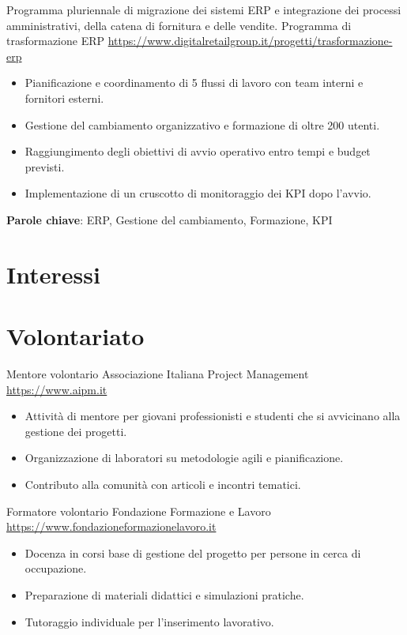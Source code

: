\documentclass[a4paper, serif, 10pt]{moderncv}
\begin{document}
        {Programma pluriennale di migrazione dei sistemi ERP e integrazione dei processi amministrativi, della catena di fornitura e delle vendite.}
        {Programma di trasformazione ERP}
        {\url{https://www.digitalretailgroup.it/progetti/trasformazione-erp}}
        {}
        {\begin{itemize}
\item Pianificazione e coordinamento di 5 flussi di lavoro con team interni e fornitori esterni.
\item Gestione del cambiamento organizzativo e formazione di oltre 200 utenti.
\item Raggiungimento degli obiettivi di avvio operativo entro tempi e budget previsti.
\item Implementazione di un cruscotto di monitoraggio dei KPI dopo l'avvio.
\end{itemize}
\textbf{Parole chiave}: ERP, Gestione del cambiamento, Formazione, KPI}
\section{Interessi}

\section{Volontariato}

        {Mentore volontario}
        {Associazione Italiana Project Management}
        {\url{https://www.aipm.it}}
        {}
        {\begin{itemize}
\item Attività di mentore per giovani professionisti e studenti che si avvicinano alla gestione dei progetti.
\item Organizzazione di laboratori su metodologie agili e pianificazione.
\item Contributo alla comunità con articoli e incontri tematici.
\end{itemize}}
    

        {Formatore volontario}
        {Fondazione Formazione e Lavoro}
        {\url{https://www.fondazioneformazionelavoro.it}}
        {}
        {\begin{itemize}
\item Docenza in corsi base di gestione del progetto per persone in cerca di occupazione.
\item Preparazione di materiali didattici e simulazioni pratiche.
\item Tutoraggio individuale per l'inserimento lavorativo.
\end{itemize}}
    
\end{document}
